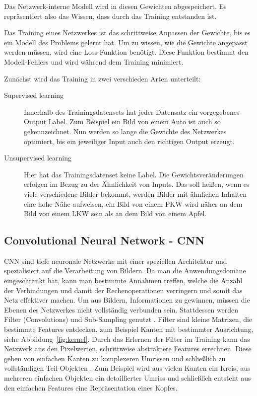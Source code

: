 \documentclass[pdftex,a4paper,halfparskip, article]{scrartcl}
\begin{document}
Das Netzwerk-interne Modell wird in diesen Gewichten abgespeichert. Es repräsentiert also das Wissen, dass durch das Training entstanden ist.

Das Training eines Netzwerkes ist das schrittweise Anpassen der Gewichte, bis es ein Modell des Problems gelernt hat. Um zu wissen, wie die Gewichte angepasst werden müssen, wird eine Loss-Funktion benötigt. Diese Funktion bestimmt den Modell-Fehlers und wird während dem Training minimiert.

Zunächst wird das Training in zwei verschieden Arten unterteilt: 

\begin{description}
	\item[Supervised learning] Innerhalb des Trainingsdatensets hat jeder Datensatz ein vorgegebenes Output Label. Zum Beispiel ein Bild von einem Auto ist auch so gekennzeichnet. Nun werden so lange die Gewichte des Netzwerkes optimiert, bis ein jeweiliger Input auch den richtigen Output erzeugt.
	\item[Unsupervised learning] Hier hat das Trainingsdatenset keine Label. Die Gewichtsveränderungen erfolgen im Bezug zu der Ähnlichkeit von Inputs. Das soll heißen, wenn es viele verschiedene Bilder bekommt, werden Bilder mit ähnlichen Inhalten eine hohe Nähe aufweisen, ein Bild von einem PKW wird näher an dem Bild von einem LKW sein als an dem Bild von einem Apfel.
\end{description}

\subsection{Convolutional Neural Network - CNN}

CNN sind tiefe neuronale Netzwerke mit einer speziellen Architektur und spezialisiert auf die Verarbeitung von Bildern. Da man die Anwendungsdomäne eingeschränkt hat, kann man bestimmte Annahmen treffen, welche die Anzahl der Verbindungen und damit der Rechenoperationen verringern und somit das Netz effektiver machen. Um aus Bildern, Informationen zu gewinnen, müssen die Ebenen des Netzwerkes nicht vollständig verbunden sein. Stattdessen werden Filter (Convolutions) und Sub-Sampling genutzt \cite{colahsBlogCnn}. Filter sind kleine Matrizen, die bestimmte Features entdecken, zum Beispiel Kanten mit bestimmter Ausrichtung, siehe Abbildung~\ref{fig:kernel}. Durch das Erlernen der Filter im Training kann das Netzwerk aus den Pixelwerten, schrittweise abstraktere Features errechnen. Diese gehen von einfachen Kanten zu komplexeren Umrissen und schließlich zu vollständigen Teil-Objekten . Zum Beispiel wird aus vielen Kanten ein Kreis, aus mehreren einfachen Objekten ein detaillierter Umriss und schließlich entsteht aus den einfachen Features eine Repräsentation eines Kopfes.
\end{document}
